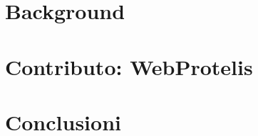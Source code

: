 \documentclass[%
  a4paper,                  %
  fontsize=12pt,            %
  oneside,                  %
  openany,                  %
  titlepage,                %
  final,                    %
  headings=standardclasses, %
  headings=big,             %
  chapterprefix=false       %
]{scrbook}
\begin{document}
  \frontmatter{}

  
  
  
  

  \tableofcontents

  \mainmatter{}

  

  \part{Background}\label{part:background}
    
    
    

  \part{Contributo: WebProtelis}\label{part:contribution}
    
    
    

  \part{Conclusioni}\label{part:conclusion}
    
    

  

  \backmatter{}
  
  
\end{document}
